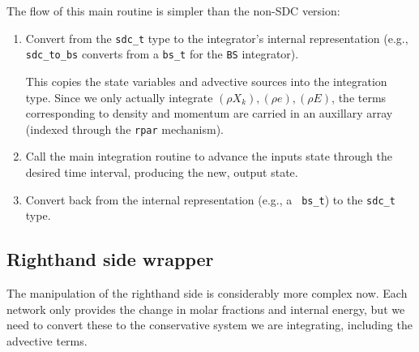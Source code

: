 The flow of this main routine is simpler than the non-SDC version:
\begin{enumerate}
\item Convert from the {\tt sdc\_t} type to the integrator's internal
  representation (e.g., {\tt sdc\_to\_bs} converts from a {\tt bs\_t}
  for the {\tt BS} integrator).

  This copies the state variables and advective sources into the
  integration type.  Since we only actually integrate $(\rho X_k),
  (\rho e), (\rho E)$, the terms corresponding to density and momentum
  are carried in an auxillary array (indexed through the {\tt rpar}
  mechanism).

\item Call the main integration routine to advance the inputs state
  through the desired time interval, producing the new, output state.

\item Convert back from the internal representation (e.g., a {\tt
  bs\_t}) to the {\tt sdc\_t} type.

\end{enumerate}

\subsection{Righthand side wrapper}

The manipulation of the righthand side is considerably more complex
now.  Each network only provides the change in molar
fractions  and internal energy, but
we need to convert these to the conservative system we are
integrating, including the advective terms.

